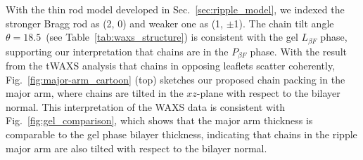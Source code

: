 With the thin rod model developed in Sec.~\ref{sec:ripple_model}, we indexed 
the stronger Bragg rod as (2, 0) and weaker one as (1, $\pm$1). 
The chain tilt angle $\theta=18.5$\textdegree\
(see Table~\ref{tab:waxs_structure}) is consistent with the gel 
$L_{\beta F}$ phase, supporting our interpretation that chains
are in the $P_{\beta F}$ phase.
With the result from the tWAXS analysis that chains in opposing leaflets
scatter coherently, Fig.~\ref{fig:major-arm_cartoon} (top) sketches
our proposed chain packing in the major arm, where
chains are tilted in the $xz$-plane with respect to the bilayer normal.
This interpretation of the WAXS data is consistent with 
Fig.~\ref{fig:gel_comparison}, 
which shows that the major arm thickness is 
comparable to the gel phase bilayer thickness, indicating that chains 
in the ripple major arm are also tilted with respect to the bilayer normal.

